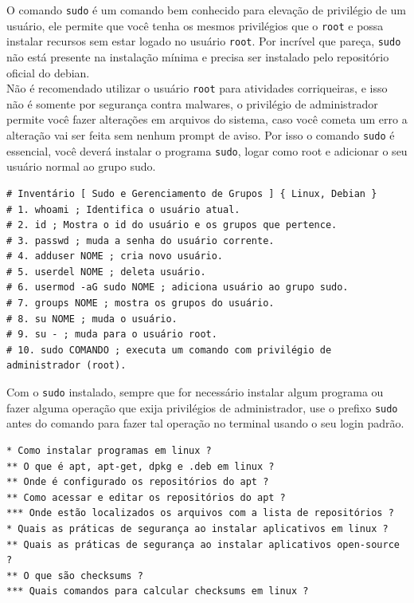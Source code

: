 \documentclass[12pt,a4paper]{article}
\begin{document}
\vspace{\baselineskip}

O comando \texttt{sudo} é um comando bem conhecido para elevação de privilégio de um usuário, ele permite que você tenha os mesmos privilégios que o \texttt{root} e possa instalar recursos sem estar logado no usuário \texttt{root}. Por incrível que pareça, \texttt{sudo} não está presente na instalação mínima e precisa ser instalado pelo repositório oficial do debian. \\

Não é recomendado utilizar o usuário \texttt{root} para atividades corriqueiras, e isso não é somente por segurança contra malwares, o privilégio de administrador permite você fazer alterações em arquivos do sistema, caso você cometa um erro a alteração vai ser feita sem nenhum prompt de aviso. Por isso o comando \texttt{sudo} é essencial, você deverá instalar o programa \texttt{sudo}, logar como root e adicionar o seu usuário normal ao grupo sudo. \\

\begin{lstlisting}
# Inventário [ Sudo e Gerenciamento de Grupos ] { Linux, Debian }
# 1. whoami ; Identifica o usuário atual.
# 2. id ; Mostra o id do usuário e os grupos que pertence.
# 3. passwd ; muda a senha do usuário corrente.
# 4. adduser NOME ; cria novo usuário.
# 5. userdel NOME ; deleta usuário. 
# 6. usermod -aG sudo NOME ; adiciona usuário ao grupo sudo.
# 7. groups NOME ; mostra os grupos do usuário.
# 8. su NOME ; muda o usuário.
# 9. su - ; muda para o usuário root.
# 10. sudo COMANDO ; executa um comando com privilégio de administrador (root).
\end{lstlisting}

\vspace{\baselineskip}

Com o \texttt{sudo} instalado, sempre que for necessário instalar algum programa ou fazer alguma operação que exija privilégios de administrador, use o prefixo \texttt{sudo} antes do comando para fazer tal operação no terminal usando o seu login padrão. \\

\begin{lstlisting}
* Como instalar programas em linux ?
** O que é apt, apt-get, dpkg e .deb em linux ?  
** Onde é configurado os repositórios do apt ? 
** Como acessar e editar os repositórios do apt ? 
*** Onde estão localizados os arquivos com a lista de repositórios ? 
* Quais as práticas de segurança ao instalar aplicativos em linux ?
** Quais as práticas de segurança ao instalar aplicativos open-source ?
** O que são checksums ?
*** Quais comandos para calcular checksums em linux ? 
\end{lstlisting}
\end{document}
